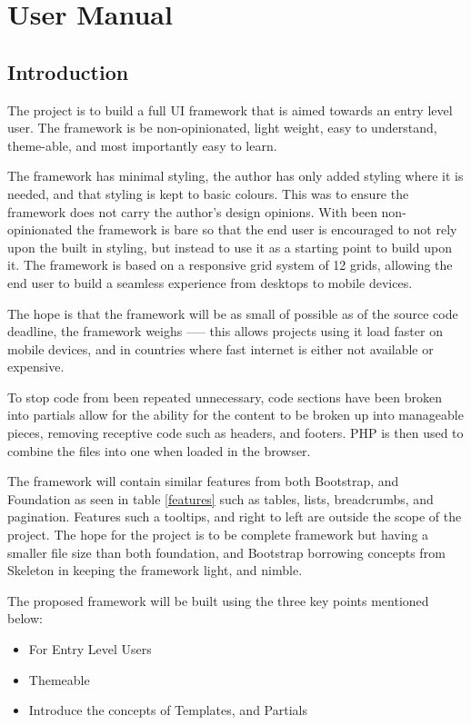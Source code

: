 \newpage
\part{User Manual}
\chapter*{Introduction}

The project is to build a full UI framework that is aimed towards an entry level user. The framework is be non-opinionated, light weight, easy to understand, theme-able, and most importantly easy to learn.

The framework has minimal styling, the author has only added styling where it is needed, and that styling is kept to basic colours. This was to ensure the framework does not carry the author's design opinions. With been non-opinionated the framework is bare so that the end user is encouraged to not rely upon the built in styling, but instead to use it as a starting point to build upon it. The framework is based on a responsive grid system of 12 grids, allowing the end user to build a seamless experience from desktops to mobile devices.

The hope is that the framework will be as small of possible as of the source code deadline, the framework weighs ----- this allows projects using it load faster on mobile devices, and in countries where fast internet is either not available or expensive. 

To stop code from been repeated unnecessary, code sections have been broken into partials allow for the ability for the content to be broken up into manageable pieces, removing receptive code such as headers, and footers. PHP is then used to combine the files into one when loaded in the browser. 

The framework will contain similar features from both Bootstrap, and Foundation as seen in table \ref{features} such as tables, lists, breadcrumbs, and pagination. Features such a tooltips, and right to left are outside the scope of the project. The hope for the project is to be complete framework but having a smaller file size than both foundation, and Bootstrap borrowing concepts from Skeleton in keeping the framework light, and nimble. 

The proposed framework will be built using the three key points mentioned below: 
\begin{itemize}
	\item For Entry Level Users
	\item Themeable
	\item Introduce the concepts of Templates, and Partials
\end{itemize}

